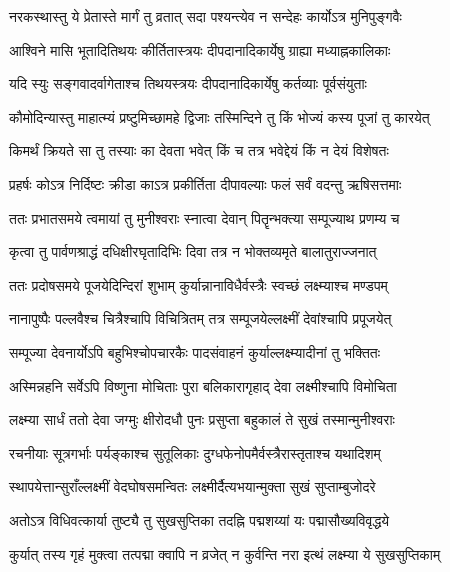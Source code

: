 \twolineshloka
{नरकस्थास्तु ये प्रेतास्ते मार्गं तु व्रतात् सदा}
{पश्यन्त्येव न सन्देहः कार्योऽत्र मुनिपुङ्गवैः} %

\twolineshloka
{आश्विने मासि भूतादितिथयः कीर्तितास्त्रयः}
{दीपदानादिकार्येषु ग्राह्या मध्याह्नकालिकाः} %

\twolineshloka
{यदि स्युः सङ्गवादर्वागेताश्च तिथयस्त्रयः}
{दीपदानादिकार्येषु कर्तव्याः पूर्वसंयुताः} %

\twolineshloka
{कौमोदिन्यास्तु माहात्म्यं प्रष्टुमिच्छामहे द्विजाः}
{तस्मिन्दिने तु किं भोज्यं कस्य पूजां तु कारयेत्} %

\twolineshloka
{किमर्थं क्रियते सा तु तस्याः का देवता भवेत्}
{किं च तत्र भवेद्देयं किं न देयं विशेषतः} %

\twolineshloka
{प्रहर्षः कोऽत्र निर्दिष्टः क्रीडा काऽत्र प्रकीर्तिता}
{दीपावल्याः फलं सर्वं वदन्तु ऋषिसत्तमाः} %


\twolineshloka
{ततः प्रभातसमये त्वमायां तु मुनीश्वराः}
{स्नात्वा देवान् पितॄन्भक्त्या सम्पूज्याथ प्रणम्य च} %

\twolineshloka
{कृत्वा तु पार्वणश्राद्धं दधिक्षीरघृतादिभिः}
{दिवा तत्र न भोक्तव्यमृते बालातुराज्जनात्} %

\twolineshloka
{ततः प्रदोषसमये पूजयेदिन्दिरां शुभाम्}
{कुर्यान्नानाविधैर्वस्त्रैः स्वच्छं लक्ष्म्याश्च मण्डपम्} %

\twolineshloka
{नानापुष्पैः पल्लवैश्च चित्रैश्चापि विचित्रितम्}
{तत्र सम्पूजयेल्लक्ष्मीं देवांश्चापि प्रपूजयेत्} %

\twolineshloka
{सम्पूज्या देवनार्योऽपि बहुभिश्चोपचारकैः}
{पादसंवाहनं कुर्याल्लक्ष्म्यादीनां तु भक्तितः} %

\twolineshloka
{अस्मिन्नहनि सर्वेऽपि विष्णुना मोचिताः पुरा}
{बलिकारागृहाद् देवा लक्ष्मीश्चापि विमोचिता} %

\twolineshloka
{लक्ष्म्या सार्धं ततो देवा जग्मुः क्षीरोदधौ पुनः}
{प्रसुप्ता बहुकालं ते सुखं तस्मान्मुनीश्वराः} %

\twolineshloka
{रचनीयाः सूत्रगर्भाः पर्यङ्काश्च सुतूलिकाः}
{दुग्धफेनोपमैर्वस्त्रैरास्तृताश्च यथादिशम्} %

\twolineshloka
{स्थापयेत्तान्सुराँल्लक्ष्मीं वेदघोषसमन्वितः}
{लक्ष्मीर्दैत्यभयान्मुक्ता सुखं सुप्ताम्बुजोदरे} %

\twolineshloka
{अतोऽत्र विधिवत्कार्या तुष्ट्यै तु सुखसुप्तिका}
{तदह्नि पद्मशय्यां यः पद्मासौख्यविवृद्धये} %

\twolineshloka
{कुर्यात् तस्य गृहं मुक्त्वा तत्पद्मा क्वापि न व्रजेत्}
{न कुर्वन्ति नरा इत्थं लक्ष्म्या ये सुखसुप्तिकाम्} %

